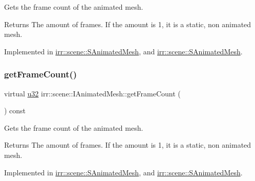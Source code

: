 Gets the frame count of the animated mesh. 

\begin{DoxyReturn}{Returns}
The amount of frames. If the amount is 1, it is a static, non animated mesh. 
\end{DoxyReturn}


Implemented in \hyperlink{structirr_1_1scene_1_1SAnimatedMesh_a58d8940d3002792194c74e209a5f2949}{irr\+::scene\+::\+S\+Animated\+Mesh}, and \hyperlink{structirr_1_1scene_1_1SAnimatedMesh_a58d8940d3002792194c74e209a5f2949}{irr\+::scene\+::\+S\+Animated\+Mesh}.

\mbox{\label{classirr_1_1scene_1_1IAnimatedMesh_a2ec99aba081e9f37802e8ea9cd65629b}} 
\subsubsection{\texorpdfstring{get\+Frame\+Count()}{getFrameCount()}\hspace{0.1cm}{\footnotesize\ttfamily [2/2]}}
{\footnotesize\ttfamily virtual \hyperlink{namespaceirr_a0416a53257075833e7002efd0a18e804}{u32} irr\+::scene\+::\+I\+Animated\+Mesh\+::get\+Frame\+Count (\begin{DoxyParamCaption}{ }\end{DoxyParamCaption}) const\hspace{0.3cm}{\ttfamily [pure virtual]}}



Gets the frame count of the animated mesh. 

\begin{DoxyReturn}{Returns}
The amount of frames. If the amount is 1, it is a static, non animated mesh. 
\end{DoxyReturn}


Implemented in \hyperlink{structirr_1_1scene_1_1SAnimatedMesh_a58d8940d3002792194c74e209a5f2949}{irr\+::scene\+::\+S\+Animated\+Mesh}, and \hyperlink{structirr_1_1scene_1_1SAnimatedMesh_a58d8940d3002792194c74e209a5f2949}{irr\+::scene\+::\+S\+Animated\+Mesh}.

\mbox{\label{classirr_1_1scene_1_1IAnimatedMesh_adccb39fee83bed36a464cf7b96f3a0ca}} 
